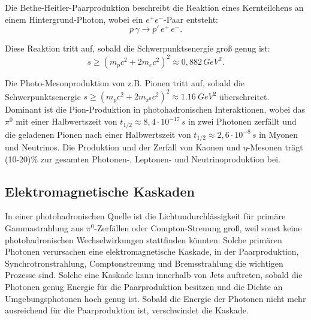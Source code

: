 Die Bethe-Heitler-Paarproduktion beschreibt die Reaktion eines Kernteilchens an einem Hintergrund-Photon, wobei ein $e^+e^-$-Paar entsteht:
\begin{equation}
 p \, \gamma \rightarrow p' \, e^+ \, e^-.
\end{equation}

Diese Reaktion tritt auf, sobald die Schwerpunktsenergie groß genug ist:
\begin{equation}
 s \geq (m_p c^2 +2 m_e c^2)^2 \approx 0,882\, \si{GeV^2}.
\end{equation}

Die Photo-Mesonproduktion von z.B. Pionen tritt auf, sobald die Schwerpunktsenergie $s \geq (m_p c^2 +2 m_{\pi^0} c^2)^2 \approx \SI{1,16}{GeV^2}$ überschreitet.
Dominant ist die Pion-Produktion in photohadronischen Interaktionen, wobei das $\pi^0$ mit einer Halbwertszeit von $t_{1/2}\approx 8,4\cdot 10^{-17}\,\si{s}$ in zwei Photonen zerfällt und die geladenen Pionen nach einer Halbwertszeit von $t_{1/2}\approx 2,6\cdot 10^{-8}\,\si{s}$ in Myonen und Neutrinos.
Die Produktion und der Zerfall von Kaonen und $\eta$-Mesonen trägt (10-20)\% zur gesamten Photonen-, Leptonen- und Neutrinoproduktion bei.\cite{RelativisticJets}


\subsection{Elektromagnetische Kaskaden}
In einer photohadronischen Quelle ist die Lichtundurchlässigkeit für primäre Gammastrahlung aus $\pi^0$-Zerfällen oder Compton-Streuung groß, weil sonst keine photohadronischen Wechselwirkungen stattfinden könnten.
Solche primären Photonen verursachen eine elektromagnetische Kaskade, in der Paarproduktion, Synchrotronstrahlung, Comptonstreuung und Bremsstrahlung die wichtigen Prozesse sind.
Solche eine Kaskade kann innerhalb von Jets auftreten, sobald die Photonen genug Energie für die Paarproduktion besitzen und die Dichte an Umgebungsphotonen hoch genug ist.
Sobald die Energie der Photonen nicht mehr ausreichend für die Paarproduktion ist, verschwindet die Kaskade.\cite{RelativisticJets}



